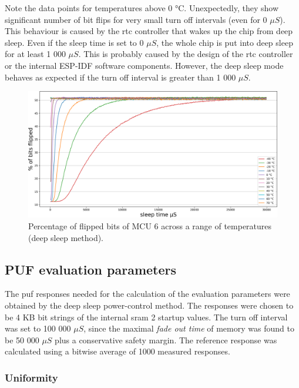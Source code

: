 Note the data points for temperatures above 0 °C. Unexpectedly, they show significant number of bit flips for very small turn off intervals (even for 0 $\mu{}S$). This behaviour is caused by the \gls{rtc} controller that wakes up the chip from deep sleep. Even if the sleep time is set to 0 $\mu{}S$, the whole chip is put into deep sleep for at least 1 000 $\mu{}S$. This is probably caused by the design of the \gls{rtc} controller or the internal ESP-IDF software components. However, the deep sleep mode behaves as expected if the turn off interval is greater than 1 000 $\mu{}S$.

\begin{figure}[ht!]
    \centering
    \captionsetup{justification=centering,margin=0.5cm}
    \includegraphics[width=\textwidth]{images/6_across_temps_deep_sleep.png}
    \caption{Percentage of flipped bits of MCU 6 across a range of temperatures (deep sleep method).}
    \label{fig:6_across_temps_deep_sleep}
\end{figure}
\subsection{PUF evaluation parameters}\label{sec:deepsleep_evaluation}

The \gls{puf} responses needed for the calculation of the evaluation parameters were obtained by the deep sleep power-control method. The responses were chosen to be 4 KB bit strings of the internal \gls{sram} 2 startup values. The turn off interval was set to 100 000 $\mu{}S$, since the maximal \emph{fade out time} of memory was found to be 50 000 $\mu{}S$ plus a conservative safety margin. The reference response was calculated using a bitwise average of 1000 measured responses.

\subsubsection*{Uniformity}

